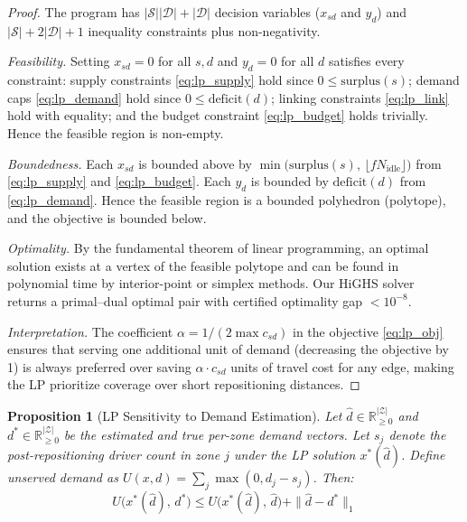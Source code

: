 \documentclass[conference,10pt]{IEEEtran}
\newtheorem{proposition}[theorem]{Proposition}
\begin{document}
\begin{proof}
The program has $|\mathcal{S}||\mathcal{D}| + |\mathcal{D}|$ decision
variables ($x_{sd}$ and $y_d$) and
$|\mathcal{S}| + 2|\mathcal{D}| + 1$ inequality constraints plus
non-negativity.

\emph{Feasibility.}
Setting $x_{sd} = 0$ for all $s,d$ and $y_d = 0$ for all $d$ satisfies
every constraint: supply constraints \eqref{eq:lp_supply} hold since
$0 \leq \text{surplus}(s)$; demand caps \eqref{eq:lp_demand} hold since
$0 \leq \text{deficit}(d)$; linking constraints \eqref{eq:lp_link}
hold with equality; and the budget constraint \eqref{eq:lp_budget}
holds trivially. Hence the feasible region is non-empty.

\emph{Boundedness.}
Each $x_{sd}$ is bounded above by
$\min\bigl(\text{surplus}(s),\, \lfloor f N_\text{idle} \rfloor\bigr)$
from \eqref{eq:lp_supply} and \eqref{eq:lp_budget}. Each $y_d$ is
bounded by $\text{deficit}(d)$ from \eqref{eq:lp_demand}. Hence the
feasible region is a bounded polyhedron (polytope), and the objective
is bounded below.

\emph{Optimality.}
By the fundamental theorem of linear programming, an optimal solution
exists at a vertex of the feasible polytope and can be found in
polynomial time by interior-point or simplex methods. Our HiGHS
solver~\cite{huangfu2018parallelizing} returns a primal--dual optimal
pair with certified optimality gap ${}<10^{-8}$.

\emph{Interpretation.}
The coefficient $\alpha = 1/(2\max c_{sd})$ in the objective
\eqref{eq:lp_obj} ensures that serving one additional unit of demand
(decreasing the objective by 1) is always preferred over saving
$\alpha \cdot c_{sd}$ units of travel cost for any edge, making the LP
prioritize coverage over short repositioning distances.
\end{proof}

\begin{proposition}[LP Sensitivity to Demand Estimation]
\label{prop:lp_sensitivity}
Let $\hat{d} \in \mathbb{R}_{\geq 0}^{|\mathcal{Z}|}$ and
$d^* \in \mathbb{R}_{\geq 0}^{|\mathcal{Z}|}$ be the estimated and true
per-zone demand vectors. Let $s_j$ denote the post-repositioning driver
count in zone $j$ under the LP solution $x^*(\hat{d})$. Define unserved
demand as $U(x, d) = \sum_j \max(0, d_j - s_j)$. Then:
\begin{equation}
  U\bigl(x^*(\hat{d}),\, d^*\bigr) \leq
  U\bigl(x^*(\hat{d}),\, \hat{d}\bigr) + \|\hat{d} - d^*\|_1
  \label{eq:sensitivity}
\end{equation}
\end{proposition}
\end{document}
